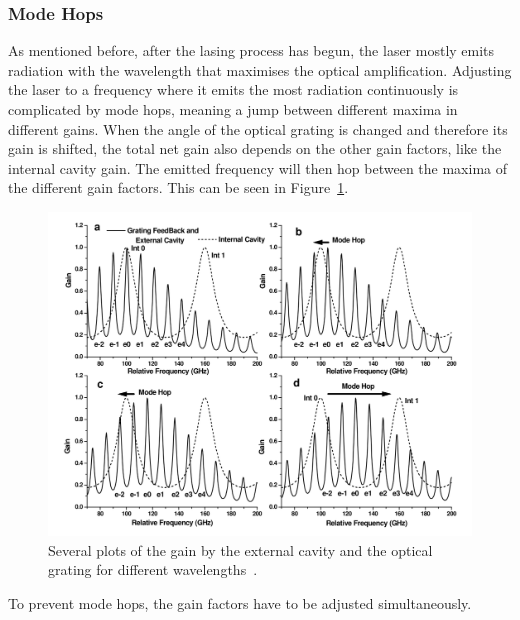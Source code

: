 \subsubsection{Mode Hops}
\label{sec:modehops}
As mentioned before, after the lasing process has begun, the laser mostly emits radiation with the wavelength
that maximises the optical amplification. Adjusting the laser to a frequency where it emits the most radiation
continuously is complicated by mode hops, meaning a jump between different maxima in different gains.
When the angle of the optical grating is changed and therefore its gain is shifted, the total net gain also
depends on the other gain factors, like the internal cavity gain. The emitted frequency will then hop between
the maxima of the different gain factors. This can be seen in Figure~\ref{fig:hophop}.
\begin{figure}
  \centering
  \includegraphics[scale=0.4]{./pictures/hophop.png}
  \caption{Several plots of the gain by the external cavity and the optical grating for different wavelengths~\cite{teachspin}.}
  \label{fig:hophop}
\end{figure}
To prevent mode hops, the gain factors have to be adjusted simultaneously.
